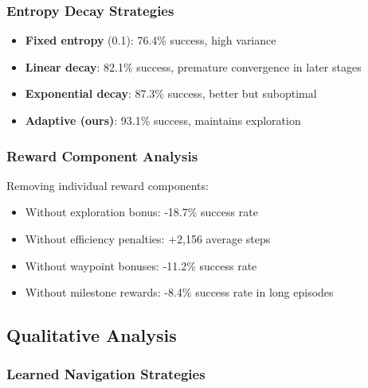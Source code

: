 \documentclass[12pt,a4paper]{article}
\begin{document}

\subsubsection{Entropy Decay Strategies}

\begin{itemize}
    \item \textbf{Fixed entropy} (0.1): 76.4\% success, high variance
    \item \textbf{Linear decay}: 82.1\% success, premature convergence in later stages  
    \item \textbf{Exponential decay}: 87.3\% success, better but suboptimal
    \item \textbf{Adaptive (ours)}: 93.1\% success, maintains exploration
\end{itemize}

\subsubsection{Reward Component Analysis}

Removing individual reward components:
\begin{itemize}
    \item Without exploration bonus: -18.7\% success rate
    \item Without efficiency penalties: +2,156 average steps
    \item Without waypoint bonuses: -11.2\% success rate
    \item Without milestone rewards: -8.4\% success rate in long episodes
\end{itemize}

\subsection{Qualitative Analysis}

\subsubsection{Learned Navigation Strategies}
\end{document}
